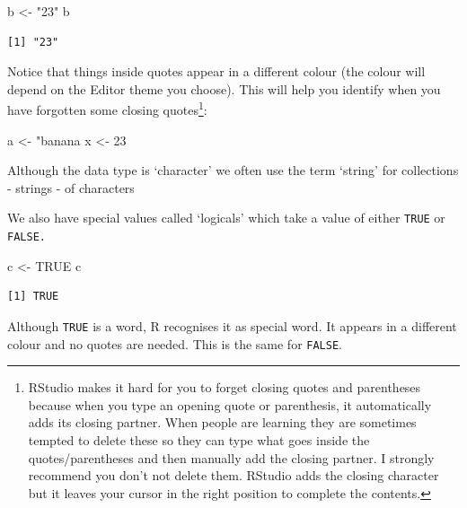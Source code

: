 \documentclass[
  letterpaper,
  DIV=11,
  numbers=noendperiod]{scrreprt}
\newenvironment{Shaded}{\begin{snugshade}}{\end{snugshade}}
\newcommand{\ConstantTok}[1]{\textcolor[rgb]{0.56,0.35,0.01}{#1}}
\newcommand{\NormalTok}[1]{\textcolor[rgb]{0.00,0.23,0.31}{#1}}
\newcommand{\OtherTok}[1]{\textcolor[rgb]{0.00,0.23,0.31}{#1}}
\newcommand{\StringTok}[1]{\textcolor[rgb]{0.13,0.47,0.30}{#1}}
\begin{document}
\begin{Shaded}
\begin{Highlighting}[]
\NormalTok{b }\OtherTok{\textless{}{-}} \StringTok{"23"}
\NormalTok{b}
\end{Highlighting}
\end{Shaded}

\begin{verbatim}
[1] "23"
\end{verbatim}

Notice that things inside quotes appear in a different colour (the
colour will depend on the Editor theme you choose). This will help you
identify when you have forgotten some closing quotes\footnote{RStudio
  makes it hard for you to forget closing quotes and parentheses because
  when you type an opening quote or parenthesis, it automatically adds
  its closing partner. When people are learning they are sometimes
  tempted to delete these so they can type what goes inside the
  quotes/parentheses and then manually add the closing partner. I
  strongly recommend you don't not delete them. RStudio adds the closing
  character but it leaves your cursor in the right position to complete
  the contents.}:

\begin{Shaded}
\begin{Highlighting}[]
\NormalTok{a }\OtherTok{\textless{}{-}} \StringTok{"banana}
\StringTok{x \textless{}{-} 23}
\end{Highlighting}
\end{Shaded}

Although the data type is `character' we often use the term `string' for
collections - strings - of characters

We also have special values called `logicals' which take a value of
either \texttt{TRUE} or \texttt{FALSE.}

\begin{Shaded}
\begin{Highlighting}[]
\NormalTok{c }\OtherTok{\textless{}{-}} \ConstantTok{TRUE}
\NormalTok{c}
\end{Highlighting}
\end{Shaded}

\begin{verbatim}
[1] TRUE
\end{verbatim}

Although \texttt{TRUE} is a word, R recognises it as special word. It
appears in a different colour and no quotes are needed. This is the same
for \texttt{FALSE}.
\end{document}
